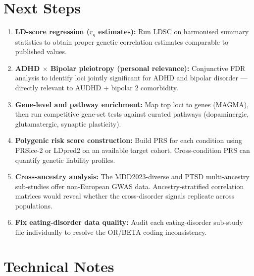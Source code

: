 \documentclass[11pt, a4paper]{article}
\begin{document}
\section{Next Steps}

\begin{enumerate}[leftmargin=1.8em]
  \item \textbf{LD-score regression ($r_g$ estimates):}
        Run LDSC on harmonised summary statistics to obtain proper genetic
        correlation estimates comparable to published values.

  \item \textbf{ADHD $\times$ Bipolar pleiotropy (personal relevance):}
        Conjunctive FDR analysis to identify loci jointly significant for ADHD
        and bipolar disorder — directly relevant to AUDHD + bipolar 2 comorbidity.

  \item \textbf{Gene-level and pathway enrichment:}
        Map top loci to genes (MAGMA), then run competitive gene-set tests against
        curated pathways (dopaminergic, glutamatergic, synaptic plasticity).

  \item \textbf{Polygenic risk score construction:}
        Build PRS for each condition using PRSice-2 or LDpred2 on an available
        target cohort. Cross-condition PRS can quantify genetic liability profiles.

  \item \textbf{Cross-ancestry analysis:}
        The MDD2023-diverse and PTSD multi-ancestry sub-studies offer non-European
        GWAS data. Ancestry-stratified correlation matrices would reveal whether
        the cross-disorder signals replicate across populations.

  \item \textbf{Fix eating-disorder data quality:}
        Audit each eating-disorder sub-study file individually to resolve the
        OR/BETA coding inconsistency.
\end{enumerate}

\section*{Technical Notes}
\end{document}

